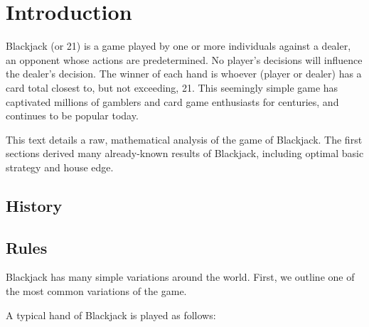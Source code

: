 
\chapter{Introduction}

Blackjack (or 21) is a game played by one or more individuals against
a dealer, an opponent whose actions are predetermined.
No player's decisions will influence the dealer's decision.  
The winner of each hand is whoever (player or dealer)
has a card total closest to, but not exceeding, 21.  
This seemingly simple game has captivated millions of gamblers
and card game enthusiasts for centuries, 
and continues to be popular today.

This text details a raw, mathematical analysis of the game of Blackjack.
The first sections derived many already-known results of Blackjack, 
including optimal basic strategy and house edge.

\section{History}

\section{Rules}

Blackjack has many simple variations around the world.
First, we outline one of the most common variations of the game.

A typical hand of Blackjack is played as follows:

